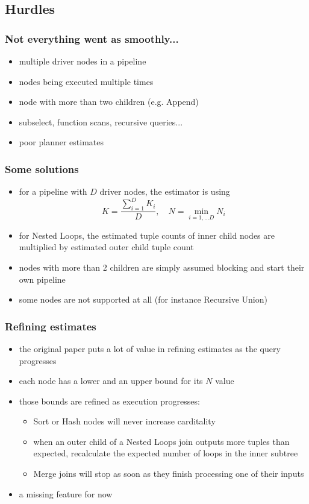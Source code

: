 \documentclass{beamer}
\begin{document}
\subsection{Hurdles}

\begin{frame}
  \frametitle{Not everything went as smoothly...}

  \begin{itemize}
  \item multiple driver nodes in a pipeline
  \item nodes being executed multiple times
  \item node with more than two children (e.g. Append)
  \item subselect, function scans, recursive queries...
  \item poor planner estimates
  \end{itemize}
\end{frame}

\begin{frame}
  \frametitle{Some solutions}

  \begin{itemize}
  \item for a pipeline with $D$ driver nodes, the estimator is using
    \begin{equation*}
      K = \frac{\sum\limits_{i=1}^{D} K_{i}}{D}, \quad N = \min\limits_{i=1,\dots D} N_{i}
    \end{equation*}
  \item for Nested Loops, the estimated tuple counts of inner child nodes are
    multiplied by estimated outer child tuple count
  \item nodes with more than 2 children are simply assumed blocking and start
    their own pipeline
  \item some nodes are not supported at all (for instance Recursive Union)
  \end{itemize}
\end{frame}

\begin{frame}
  \frametitle{Refining estimates}

  \begin{itemize}
  \item the original paper puts a lot of value in refining estimates as the
    query progresses
  \item each node has a lower and an upper bound for its $N$ value
  \item those bounds are refined as execution progresses:
    \begin{itemize}
    \item Sort or Hash nodes will never increase carditality
    \item when an outer child of a Nested Loops join outputs more tuples than
      expected, recalculate the expected number of loops in the inner subtree
    \item Merge joins will stop as soon as they finish processing one of their
      inputs
    \end{itemize}
  \item a missing feature for now
  \end{itemize}
\end{frame}
\end{document}
